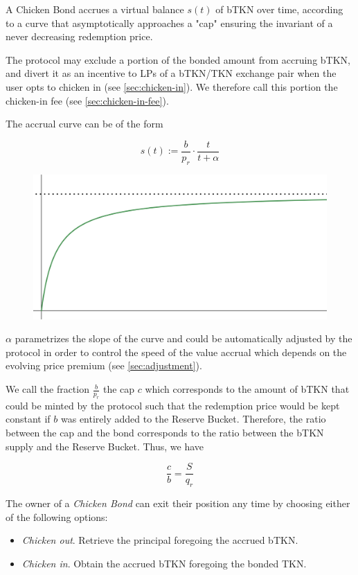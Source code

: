 \documentclass{article}
\begin{document}
A Chicken Bond accrues a virtual balance $s(t)$ of bTKN over time, according to a curve that asymptotically approaches a "cap" ensuring the invariant of a never decreasing redemption price. 

The protocol may exclude a portion of the bonded amount from accruing bTKN, and divert it as an incentive to LPs of a bTKN/TKN exchange pair when the user opts to chicken in (see \ref{sec:chicken-in}). We therefore call this portion the chicken-in fee (see \ref{sec:chicken-in-fee}).

The accrual curve can be of the form 

\begin{equation}
  \label{eq:accrual}
    s(t) := \frac{b}{p_r} \cdot \frac{t}{t+\alpha}
\end{equation}

\begin{figure}[ht]
    \centering
    \includegraphics[width=0.5\linewidth]{./ChickenBonds_Whitepaper_accrualcurve.png}
\end{figure}

$\alpha$ parametrizes the slope of the curve and could be automatically adjusted by the protocol in order to control the speed of the value accrual which depends on the evolving price premium (see \ref{sec:adjustment}).

We call the fraction $\frac{b}{p_r}$ the cap $c$ which corresponds to the amount of bTKN that could be minted by the protocol such that the redemption price would be kept constant if $b$ was entirely added to the Reserve Bucket. Therefore, the ratio between the cap and the bond corresponds to the ratio between the bTKN supply and the Reserve Bucket. Thus, we have

\begin{equation}
  \label{eq:cap-bond-ratio}
    \frac{c}{b} = \frac{S}{q_r}
\end{equation}   

The owner of a \textit{Chicken Bond} can exit their position any time by choosing either of the following options:

\begin{itemize}
    \item \textit{Chicken out}. Retrieve the principal foregoing the accrued bTKN.
    \item \textit{Chicken in}. Obtain the accrued bTKN foregoing the bonded TKN.
\end{itemize}
\end{document}
